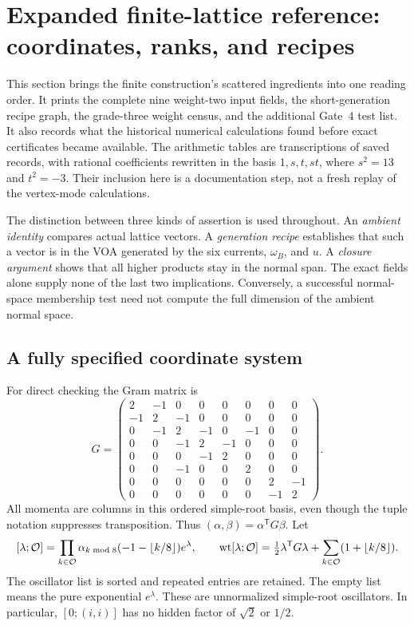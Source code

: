 \section{Expanded finite-lattice reference: coordinates, ranks, and recipes}
\label{expfinite:reference}

This section brings the finite construction's scattered ingredients into
one reading order. It prints the complete nine weight-two input fields,
the short-generation recipe graph, the grade-three weight census, and
the additional Gate~4 test list. It also records what the historical
numerical calculations found before exact certificates became available.
The arithmetic tables are transcriptions of saved records, with rational
coefficients rewritten in the basis $1,s,t,st$, where $s^2=13$ and
$t^2=-3$. Their inclusion here is a documentation step, not a fresh replay
of the vertex-mode calculations.

The distinction between three kinds of assertion is used throughout.
An \emph{ambient identity} compares actual lattice vectors. A
\emph{generation recipe} establishes that such a vector is in the VOA
generated by the six currents, $\omega_B$, and $u$. A
\emph{closure argument} shows that all higher products stay in the
normal span. The exact fields alone supply none of the last two
implications. Conversely, a successful normal-space membership test
need not compute the full dimension of the ambient normal space.

\subsection{A fully specified coordinate system}
\label{expfinite:coordinates}

For direct checking the Gram matrix is
\[
G=\begin{pmatrix}
2&-1&0&0&0&0&0&0\\
-1&2&-1&0&0&0&0&0\\
0&-1&2&-1&0&-1&0&0\\
0&0&-1&2&-1&0&0&0\\
0&0&0&-1&2&0&0&0\\
0&0&-1&0&0&2&0&0\\
0&0&0&0&0&0&2&-1\\
0&0&0&0&0&0&-1&2
\end{pmatrix}.
\]
All momenta are columns in this ordered simple-root basis, even though
the tuple notation suppresses transposition. Thus
$(\alpha,\beta)=\alpha^{\mathsf T}G\beta$. Let
\[
 [\lambda;\mathcal O]
 =\prod_{k\in\mathcal O}\alpha_{k\bmod8}
       (-1-\lfloor k/8\rfloor)e^\lambda,
\qquad
\operatorname{wt}[\lambda;\mathcal O]
 =\tfrac12\lambda^{\mathsf T}G\lambda+
       \sum_{k\in\mathcal O}(1+\lfloor k/8\rfloor).
\]
The oscillator list is sorted and repeated entries are retained.
The empty list means the pure exponential $e^\lambda$. These are
unnormalized simple-root oscillators. In particular,
$[0;(i,i)]$ has no hidden factor of $\sqrt2$ or $1/2$.

